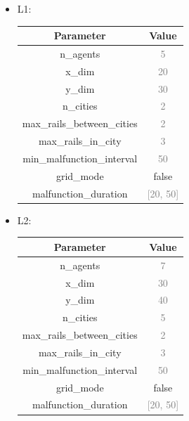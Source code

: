 \documentclass[12pt]{article}
\begin{document}
\begin{itemize}
    \item L1: 
\begin{center}
\begin{tabular}{ |c|c| } 
    \hline
\textbf{Parameter} & \textbf{Value} \\ 
    \hline
\textcolor{BrickRed}{n\_agents} & \textcolor{gray}{5} \\ 
    \hline
\textcolor{BrickRed}{x\_dim} & \textcolor{gray}{20}\\ 
    \hline
\textcolor{BrickRed}{y\_dim} & \textcolor{gray}{30}\\ 
    \hline
\textcolor{BrickRed}{n\_cities} & \textcolor{gray}{2}\\ 
    \hline
\textcolor{BrickRed}{ max\_rails\_between\_cities} & \textcolor{gray}{2}\\ 
    \hline
\textcolor{BrickRed}{max\_rails\_in\_city} & \textcolor{gray}{3}\\ 
    \hline
\textcolor{BrickRed}{min\_malfunction\_interval} & \textcolor{gray}{50}\\ 
    \hline
\textcolor{BrickRed}{grid\_mode} & \textcolor{OliveGreen}{false}\\ 
    \hline
\textcolor{BrickRed}{malfunction\_duration} & \textcolor{gray}{[20, 50]}\\ 
\hline
\end{tabular}
\end{center}

        
    \item L2: 
\begin{center}
\begin{tabular}{ |c|c| } 
    \hline
\textbf{Parameter} & \textbf{Value} \\ 
    \hline
\textcolor{BrickRed}{n\_agents} & \textcolor{gray}{7} \\ 
    \hline
\textcolor{BrickRed}{x\_dim} & \textcolor{gray}{30}\\ 
    \hline
\textcolor{BrickRed}{y\_dim} & \textcolor{gray}{40}\\ 
    \hline
\textcolor{BrickRed}{n\_cities} & \textcolor{gray}{5}\\ 
    \hline
\textcolor{BrickRed}{ max\_rails\_between\_cities} & \textcolor{gray}{2}\\ 
    \hline
\textcolor{BrickRed}{max\_rails\_in\_city} & \textcolor{gray}{3}\\ 
    \hline
\textcolor{BrickRed}{min\_malfunction\_interval} & \textcolor{gray}{50}\\ 
    \hline
\textcolor{BrickRed}{grid\_mode} & \textcolor{OliveGreen}{false}\\ 
    \hline
\textcolor{BrickRed}{malfunction\_duration} & \textcolor{gray}{[20, 50]}\\ 
\hline
\end{tabular}
\end{center}


\end{itemize}
\end{document}
